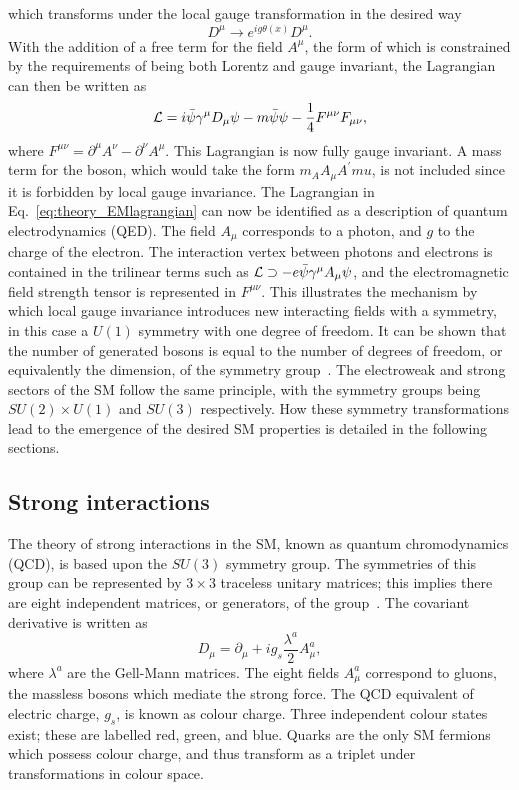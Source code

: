 which transforms under the local gauge transformation in the desired way
\begin{equation}
D^\mu \rightarrow e^{ig\theta(x)} D^\mu .
\end{equation}
With the addition of a free term for the field $A^\mu$, 
the form of which is constrained by the requirements of being both Lorentz and gauge invariant, 
the Lagrangian can then be written as
\begin{equation}
\label{eq:theory_EMlagrangian}
\mathcal{L} = i \bar{\psi} \gamma^\mu D_\mu \psi - m\bar{\psi}\psi - \frac{1}{4} F^{\mu\nu}F_{\mu\nu},
\end{equation}
where $F^{\mu\nu} = \partial^\mu A^\nu - \partial^\nu A^\mu$.
This Lagrangian is now fully gauge invariant.
A mass term for the boson, which would take the form $m_A A_\mu A^'mu$, 
is not included since it is forbidden by local gauge invariance.
The Lagrangian in Eq.~\ref{eq:theory_EMlagrangian} 
can now be identified as a description of quantum electrodynamics (QED).
The field $A_\mu$ corresponds to a photon, and $g$ to the charge of the electron.
The interaction vertex between photons and electrons is contained in the trilinear terms
such as $\mathcal{L} \supset -e \bar{\psi} \gamma^\mu A_\mu \psi$, 
and the electromagnetic field strength tensor is represented in $F^{\mu\nu}$.
This illustrates the mechanism by which local gauge invariance introduces new interacting fields
with a symmetry, in this case a $U(1)$ symmetry with one degree of freedom.
It can be shown that the number of generated bosons is equal to the number of degrees of freedom, 
or equivalently the dimension, of the symmetry group~\cite{Peskin}.
The electroweak and strong sectors of the SM follow the same principle, 
with the symmetry groups being $SU(2) \times U(1)$ and $SU(3)$ respectively.
How these symmetry transformations lead to the emergence of the desired SM properties 
is detailed in the following sections.

\subsection{Strong interactions}

The theory of strong interactions in the SM, known as quantum chromodynamics (QCD), 
is based upon the $SU(3)$ symmetry group.
The symmetries of this group can be represented by $3\times3$ traceless unitary matrices;
this implies there are eight independent matrices, or generators, of the group~\cite{Thomson}.
The covariant derivative is written as
\begin{equation}
D_\mu = \partial_\mu + i g_s \frac{\lambda^a}{2} A^a_\mu ,
\end{equation}
where $\lambda^a$ are the Gell-Mann matrices.
The eight fields $A^a_\mu$ correspond to gluons, 
the massless bosons which mediate the strong force.
The QCD equivalent of electric charge, $g_s$, is known as colour charge.
Three independent colour states exist; these are labelled red, green, and blue.
Quarks are the only SM fermions which possess colour charge, 
and thus transform as a triplet under transformations in colour space.

